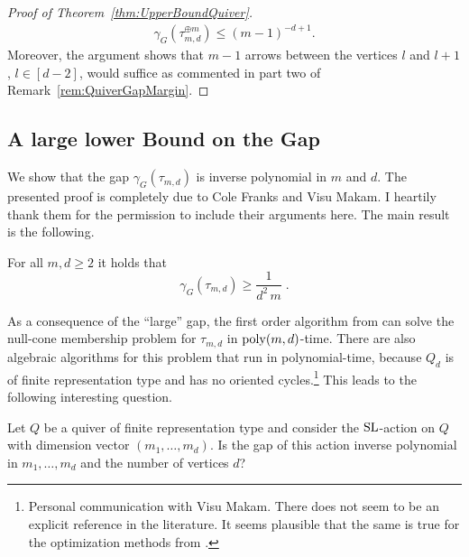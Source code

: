 \begin{proof}[Proof of Theorem~\ref{thm:UpperBoundQuiver}]
	\begin{align*}
		\gamma_{G}(\tau_{m,d}^{\oplus m}) \leq (m-1)^{-d+1}.
	\end{align*}
	Moreover, the argument shows that $m-1$ arrows between the vertices $l$ and $l+1$, $l \in [d-2]$, would suffice as commented in part two of Remark~\ref{rem:QuiverGapMargin}.
\end{proof}





\subsection{A large lower Bound on the Gap} \label{subsec:QuiverLowerBound}


We show that the gap $\gamma_G(\tau_{m,d})$ is inverse polynomial in $m$ and $d$. The presented proof is completely due to Cole Franks and Visu Makam. I heartily thank them for the permission to include their arguments here. 
The main result is the following.

\begin{theorem} \label{thm:LargeGapQuiver}
	For all $m,d \geq 2$ it holds that
		\[ \gamma_G(\tau_{m,d}) \geq \frac{1}{d^2\, m} \; .\]
\end{theorem} %

As a consequence of the ``large'' gap, the first order algorithm from \cite{GradflowArXiv} can solve the null-cone membership problem for $\tau_{m,d}$ in $\operatorname{poly}(m,d)$-time. There are also algebraic algorithms for this problem that run in polynomial-time, because $Q_d$ is of finite representation type and has no oriented cycles.\footnote{Personal communication with Visu Makam. There does not seem to be an explicit reference in the literature. It seems plausible that the same is true for the optimization methods from \cite{GradflowArXiv}.} This leads to the following interesting question.

\begin{problem}
	Let $Q$ be a quiver of finite representation type and consider the $\operatorname{SL}$-action on $Q$ with dimension vector $(m_1, \ldots, m_d)$.
	Is the gap of this action inverse polynomial in $m_1,\ldots,m_d$ and the number of vertices $d$?
\end{problem}

